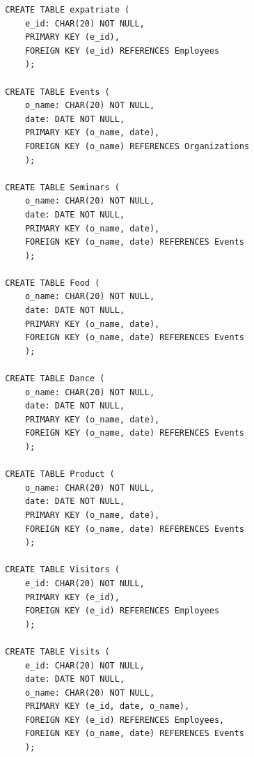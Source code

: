 \begin{enumerate}[label = {(\alph*)}]
\begin{verbatim}
        CREATE TABLE expatriate (
            e_id: CHAR(20) NOT NULL,
            PRIMARY KEY (e_id),
            FOREIGN KEY (e_id) REFERENCES Employees
            );
            
        CREATE TABLE Events (
            o_name: CHAR(20) NOT NULL,
            date: DATE NOT NULL,
            PRIMARY KEY (o_name, date),
            FOREIGN KEY (o_name) REFERENCES Organizations
            );
        
        CREATE TABLE Seminars (
            o_name: CHAR(20) NOT NULL,
            date: DATE NOT NULL,
            PRIMARY KEY (o_name, date),
            FOREIGN KEY (o_name, date) REFERENCES Events
            );
        
        CREATE TABLE Food (
            o_name: CHAR(20) NOT NULL,
            date: DATE NOT NULL,
            PRIMARY KEY (o_name, date),
            FOREIGN KEY (o_name, date) REFERENCES Events
            );
            
        CREATE TABLE Dance (
            o_name: CHAR(20) NOT NULL,
            date: DATE NOT NULL,
            PRIMARY KEY (o_name, date),
            FOREIGN KEY (o_name, date) REFERENCES Events
            );
            
        CREATE TABLE Product (
            o_name: CHAR(20) NOT NULL,
            date: DATE NOT NULL,
            PRIMARY KEY (o_name, date),
            FOREIGN KEY (o_name, date) REFERENCES Events
            );
            
        CREATE TABLE Visitors (
            e_id: CHAR(20) NOT NULL,
            PRIMARY KEY (e_id),
            FOREIGN KEY (e_id) REFERENCES Employees
            );
        
        CREATE TABLE Visits (
            e_id: CHAR(20) NOT NULL,
            date: DATE NOT NULL,
            o_name: CHAR(20) NOT NULL,
            PRIMARY KEY (e_id, date, o_name),
            FOREIGN KEY (e_id) REFERENCES Employees,
            FOREIGN KEY (o_name, date) REFERENCES Events
            );
    \end{verbatim}
    
\end{enumerate}